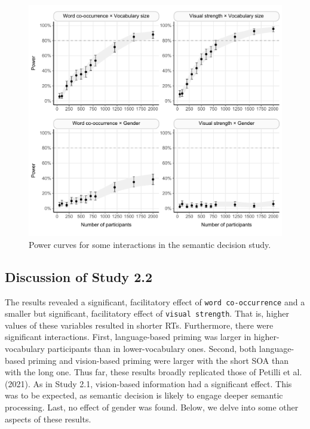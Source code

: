\documentclass[
  12pt,
  man,floatsintext]{apa7}
\begin{document}
\begin{figure}

{\centering \includegraphics[width=1\linewidth]{../semanticdecision/power_analysis/plots/semanticdecision_powercurve_plots_4_5_6_7} 

}

\caption{Power curves for some interactions in the semantic decision study.}\label{fig:semanticdecision-powercurve-plots-4-5-6-7}
\end{figure}

\hypertarget{discussion-of-study-2.2}{%
\subsection{Discussion of Study 2.2}\label{discussion-of-study-2.2}}

The results revealed a significant, facilitatory effect of \texttt{word\ co-occurrence} and a smaller but significant, facilitatory effect of \texttt{visual\ strength}. That is, higher values of these variables resulted in shorter RTs. Furthermore, there were significant interactions. First, language-based priming was larger in higher-vocabulary participants than in lower-vocabulary ones. Second, both language-based priming and vision-based priming were larger with the short SOA than with the long one. Thus far, these results broadly replicated those of Petilli et al. (2021). As in Study 2.1, vision-based information had a significant effect. This was to be expected, as semantic decision is likely to engage deeper semantic processing. Last, no effect of gender was found. Below, we delve into some other aspects of these results.
\end{document}
